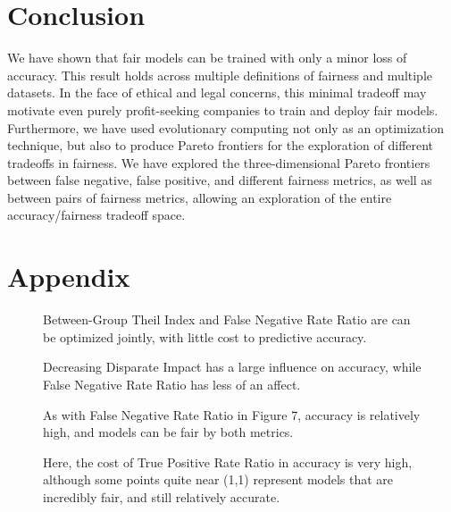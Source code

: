 \documentclass[twoside]{article}
\newcommand{\figures}[4]{
	\begin{figure}[H]{
		\centering{
			\texttt{[image: \#1]}
		}
		\caption{#2}
		}
	\end{figure}
	\begin{figure}[H] {
		\centering{
			\texttt{[image: \#3]}
		}
		\caption{#4}
	}
	\end{figure}
}
\begin{document}
\section{Conclusion}
We have shown that fair models can be trained with only a minor loss of accuracy. This result holds across multiple definitions of fairness and multiple datasets. In the face of ethical and legal concerns, this minimal tradeoff may motivate even purely profit-seeking companies to train and deploy fair models. Furthermore, we have used evolutionary computing not only as an optimization technique, but also to produce Pareto frontiers for the exploration of different tradeoffs in fairness. We have explored the three-dimensional Pareto frontiers between false negative, false positive, and different fairness metrics, as well as between pairs of fairness metrics, allowing an exploration of the entire accuracy/fairness tradeoff space.
 





\section{Appendix}
\figures{FNR Ratio|Between-Group Theil Index|COMPAS.png}{ Between-Group Theil Index and False Negative Rate Ratio are can be optimized jointly, with little cost to predictive accuracy.}{FNR Ratio|Disparate Impact|COMPAS.png}{Decreasing Disparate Impact has a large influence on accuracy, while False Negative Rate Ratio has less of an affect.}

\figures{TPR Ratio|Between-Group Theil Index|COMPAS.png}{As with False Negative Rate Ratio in Figure 7, accuracy is relatively high, and models can be fair by both metrics.}{TPR Ratio|FNR Ratio|COMPAS.png}{Here, the cost of True Positive Rate Ratio in accuracy is very high, although some points quite near (1,1) represent models that are incredibly fair, and still relatively accurate.}
\end{document}
